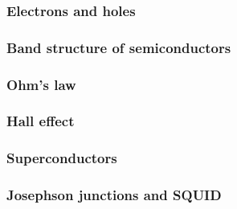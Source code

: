\documentclass{beamer}
\begin{document}
\begin{frame}
\frametitle{Electrons and holes}
\end{frame}

\begin{frame}
\frametitle{Band structure of semiconductors}
\end{frame}

\begin{frame}
\frametitle{Ohm's law}
\end{frame}

\begin{frame}
\frametitle{Hall effect}
\end{frame}

\begin{frame}
\frametitle{Superconductors}
\end{frame}

\begin{frame}
\frametitle{Josephson junctions and SQUID}
\end{frame}
\end{document}
